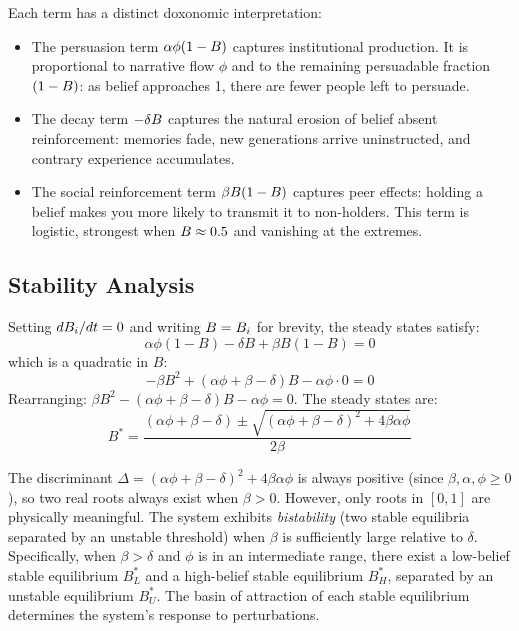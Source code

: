 Each term has a distinct doxonomic interpretation:
\begin{itemize}[nosep]
  \item The persuasion term $\alpha\phi(1-B_{})$ captures institutional production.
  It is proportional to narrative flow $\phi$ and to the remaining persuadable fraction $(1-B_{})$: as belief approaches 1, there are fewer people left to persuade.
  \item The decay term $-\delta B_{}$ captures the natural erosion of belief absent reinforcement: memories fade, new generations arrive uninstructed, and contrary experience accumulates.
  \item The social reinforcement term $\beta B_{}(1-B_{})$ captures peer effects: holding a belief makes you more likely to transmit it to non-holders.
  This term is logistic, strongest when $B_{} \approx 0.5$ and vanishing at the extremes.
\end{itemize}

\subsection{Stability Analysis}

\begin{proposition}
\label{prop:steady-states}
Setting $dB_{i}/dt = 0$ and writing $B = B_{i}$ for brevity, the steady states satisfy:
\[
  \alpha\phi(1-B) - \delta B + \beta B(1-B) = 0
\]
which is a quadratic in $B$:
\[
  -\beta B^2 + (\alpha\phi + \beta - \delta)B - \alpha\phi \cdot 0 = 0
\]
Rearranging: $\beta B^2 - (\alpha\phi + \beta - \delta)B - \alpha\phi = 0$.
The steady states are:
\begin{equation}
\label{eq:steady-states}
  B^* = \frac{(\alpha\phi + \beta - \delta) \pm \sqrt{(\alpha\phi + \beta - \delta)^2 + 4\beta\alpha\phi}}{2\beta}
\end{equation}
\end{proposition}

\begin{remark}
\label{rem:bistability}
The discriminant $\Delta = (\alpha\phi + \beta - \delta)^2 + 4\beta\alpha\phi$ is always positive (since $\beta, \alpha, \phi \geq 0$), so two real roots always exist when $\beta > 0$.
However, only roots in $[0,1]$ are physically meaningful.
The system exhibits \emph{bistability} (two stable equilibria separated by an unstable threshold) when $\beta$ is sufficiently large relative to $\delta$.
Specifically, when $\beta > \delta$ and $\phi$ is in an intermediate range, there exist a low-belief stable equilibrium $B_L^*$ and a high-belief stable equilibrium $B_H^*$, separated by an unstable equilibrium $B_U^*$.
The basin of attraction of each stable equilibrium determines the system's response to perturbations.
\end{remark}

